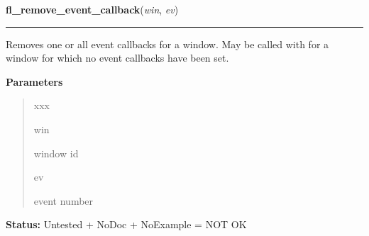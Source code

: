     \vspace{0.5ex}

\hspace{.8\funcindent}\begin{boxedminipage}{\funcwidth}

    \raggedright \textbf{fl\_remove\_event\_callback}(\textit{win}, \textit{ev})

    \vspace{-1.5ex}

    \rule{\textwidth}{0.5\fboxrule}
\setlength{\parskip}{2ex}
    Removes one or all event callbacks for a window. May be called with for
    a window for which no event callbacks have been set.

\setlength{\parskip}{1ex}
      \textbf{Parameters}
      \vspace{-1ex}

      \begin{quote}
        \begin{Ventry}{xxx}

          \item[win]

          window id

          \item[ev]

          event number

        \end{Ventry}

      \end{quote}

\textbf{Status:} Untested + NoDoc + NoExample = NOT OK



    \end{boxedminipage}

    \label{xformslib:library:fl_activate_event_callbacks}

    \vspace{0.5ex}

